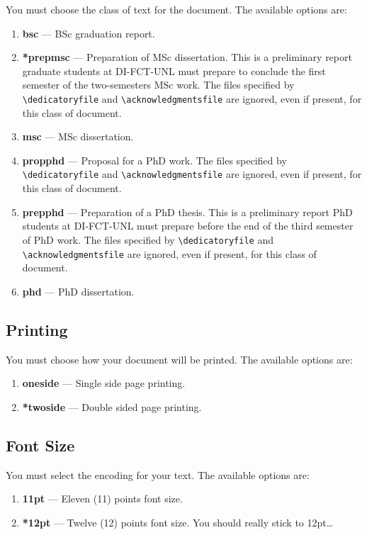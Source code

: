 You must choose the class of text for the document. The available options are:

\begin{enumerate}
	\item \textbf{bsc} --- BSc graduation report.
	\item \textbf{*prepmsc} --- Preparation of MSc dissertation. This is a preliminary report graduate students at DI-FCT-UNL must prepare to conclude the first semester of the two-semesters MSc work. The files specified by \verb!\dedicatoryfile! and \verb!\acknowledgmentsfile! are ignored, even if present, for this class of document.
	\item \textbf{msc} --- MSc dissertation.
	\item \textbf{propphd} ---  Proposal for a PhD work. The files specified by \verb!\dedicatoryfile! and \verb!\acknowledgmentsfile! are ignored, even if present, for this class of document.
	\item \textbf{prepphd} ---  Preparation of a PhD thesis. This is a preliminary report PhD students at DI-FCT-UNL must prepare before the end of the third semester of PhD work. The files specified by \verb!\dedicatoryfile! and \verb!\acknowledgmentsfile! are ignored, even if present, for this class of document.
	\item \textbf{phd} --- PhD dissertation.
\end{enumerate}

\subsection{Printing} %
\label{sub:printing}

You must choose how your document will be printed. The available options are:
\begin{enumerate}
	\item \textbf{oneside} --- Single side page printing.
	\item \textbf{*twoside} --- Double sided page printing.
\end{enumerate}

\subsection{Font Size} %
\label{ssec:font_size}

You must select the encoding for your text. The available options are:
\begin{enumerate}
	\item \textbf{11pt} --- Eleven (11) points font size.
	\item \textbf{*12pt} --- Twelve (12) points font size. You should really stick to 12pt\ldots
\end{enumerate}

